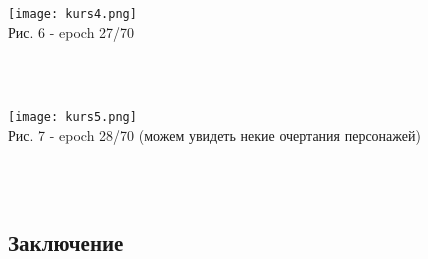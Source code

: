 \documentclass{article}
\begin{document}
    \begin{center} 
    \texttt{[image: kurs4.png]}
    \\
    \caption{Рис. 6 - epoch 27/70}
    \\ \\
    \end{center} 
    
    \begin{center} 
    \texttt{[image: kurs5.png]}
    \\
    \caption{Рис. 7 - epoch 28/70 (можем увидеть некие очертания персонажей)}
    \\ \\
    \end{center} 
    
    
    
    
    
    
    \newpage
    \begin{center} 
    \section{Заключение}
    \end{center}
    \large
    
\end{document}
